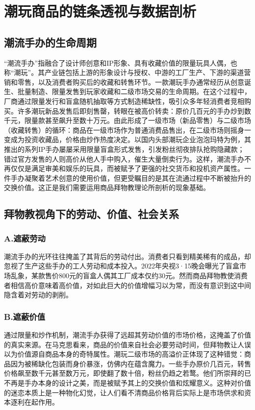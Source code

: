 
\chapter{潮玩商品的链条透视与数据剖析}
\section{潮流手办的生命周期}
“潮流手办”指融合了设计师创意和IP形象、具有收藏价值的限量玩具人偶，也称“潮玩”。其产业链包括上游的形象设计与授权、中游的工厂生产、下游的渠道营销和零售，以及消费者购买后的收藏和转售环节\cite{KJRB202504240063,JSJJ20241129A020}。一款潮玩手办通常经历从创意诞生、批量制造、限量发售到玩家收藏和二级市场交易的生命周期。在这个过程中，厂商通过限量发行和盲盒随机抽取等方式制造稀缺性，吸引众多年轻消费者竞相购买\cite{ChaoWanChanYeFaZhanBaoGao2023XinHuaWang}。许多潮玩新品发售后即刻售罄，转眼在被高价转卖：原价几百元的手办炒到数千元，限量款甚至飙升至数十万元\cite{ZWWJ202412008}。由此形成了一级市场（新品零售）与二级市场（收藏转售）的循环：商品在一级市场作为普通消费品售出，在二级市场则摇身一变成为投资收藏品，价格由炒作热度决定。以国内头部潮玩企业泡泡玛特为例，其推出的系列IP手办屡屡采用限量盲盒形式发售，引发粉丝彻夜排队抢购隐藏款\cite{QIGL202501018,SCZK202413018}；错过官方发售的人则高价从他人手中购入，催生大量倒卖行为。这样，潮流手办不再仅仅是满足审美和娱乐的玩具，而被赋予了更强的社交货币和投机资产属性。一件手办凝聚着艺术创意的使用价值，但更受瞩目的是其在流通过程中不断被抬升的交换价值。这正是我们需要运用商品拜物教理论所剖析的现象基础。
\section{拜物教视角下的劳动、价值、社会关系}
\subsection*{A.遮蔽劳动}
潮流手办的光环往往掩盖了其背后的劳动付出。消费者只看到精美稀有的成品，却忽视了生产这些手办的工人劳动和成本投入\cite{song2024guan}。2022年央视3·15晚会曝光了盲盒市场乱象，某款售价800元的盲盒人偶其工厂成本仅约30元\cite{ModernExpress2022BlindBoxRegulation}。然而商品拜物教使消费者相信高价意味着高价值，对如此巨大的价值增幅习以为常，而没有意识到这中间隐含着对劳动的剥削。
\subsection*{B.遮蔽价值}
通过限量和炒作机制，潮流手办获得了远超其劳动价值的市场价格，这掩盖了价值的真实来源。在马克思看来，商品的价值来自社会必要劳动时间，但拜物教让人误以为价值源自商品本身的奇特属性\cite{XJZS202406003}。潮玩二级市场的高溢价正体现了这种错觉：商品因为被稀缺化包装而身价暴涨，仿佛内在蕴含魔力。一些手办原价几百元，转售价格飙至数千元甚至数万元，即使翻了数十倍，粉丝仍趋之若鹜\cite{SouhuNews2022TidePlayReport}。他们所崇拜的已不再是手办本身的设计之美，而是被赋予其上的交换价值和炫耀意义。这种对价值的迷恋本质上是一种物化幻觉，让人们看不清商品价格背后实际上是市场供求和资本逐利在起作用。
